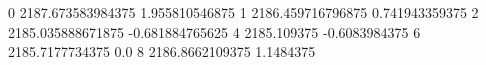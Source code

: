 0 2187.673583984375 1.955810546875
1 2186.459716796875 0.741943359375
2 2185.035888671875 -0.681884765625
4 2185.109375 -0.6083984375
6 2185.7177734375 0.0
8 2186.8662109375 1.1484375
